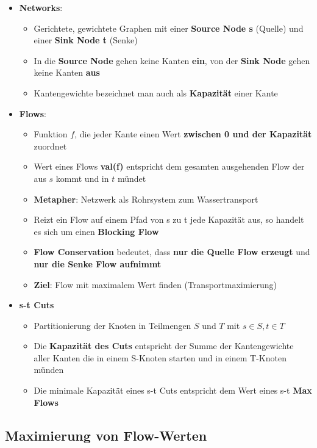 \documentclass[10pt,a4paper]{article}
\begin{document}
	\begin{itemize}
		\item \textbf{Networks}:
		\begin{itemize}
			\item Gerichtete, gewichtete Graphen mit einer \textbf{Source Node s} (Quelle) und einer \textbf{Sink Node t} (Senke)
			\item In die \textbf{Source Node} gehen keine Kanten \textbf{ein}, von der \textbf{Sink Node} gehen keine Kanten \textbf{aus}
			\item Kantengewichte bezeichnet man auch als \textbf{Kapazität} einer Kante
		\end{itemize}
		\item \textbf{Flows}:
		\begin{itemize}
			\item Funktion $f$, die jeder Kante einen Wert \textbf{zwischen 0 und der Kapazität} zuordnet
			\item Wert eines Flows \textbf{val(f)} entspricht dem gesamten ausgehenden Flow der aus $s$ kommt und in $t$ mündet
			\item \textbf{Metapher}: Netzwerk als Rohrsystem zum Wassertransport
			\item Reizt ein Flow auf einem Pfad von s zu t jede Kapazität aus, so handelt es sich um einen \textbf{Blocking Flow}
			\item \textbf{Flow Conservation} bedeutet, dass \textbf{nur die Quelle Flow erzeugt} und \textbf{nur die Senke Flow aufnimmt}
			\item \textbf{Ziel}: Flow mit maximalem Wert finden (Transportmaximierung)
		\end{itemize}
		\item \textbf{s-t Cuts}
		\begin{itemize}
			\item Partitionierung der Knoten in Teilmengen $S$ und $T$ mit $s \in S, t \in T$
			\item Die \textbf{Kapazität des Cuts} entspricht der Summe der Kantengewichte aller Kanten die in einem S-Knoten starten und in einem T-Knoten münden
			\item Die minimale Kapazität eines s-t Cuts entspricht dem Wert eines s-t \textbf{Max Flows}
		\end{itemize}
	\end{itemize}

	\subsection{Maximierung von Flow-Werten}
	\label{mfm:sub:maximierung_von_flow_werten}
	
\end{document}
